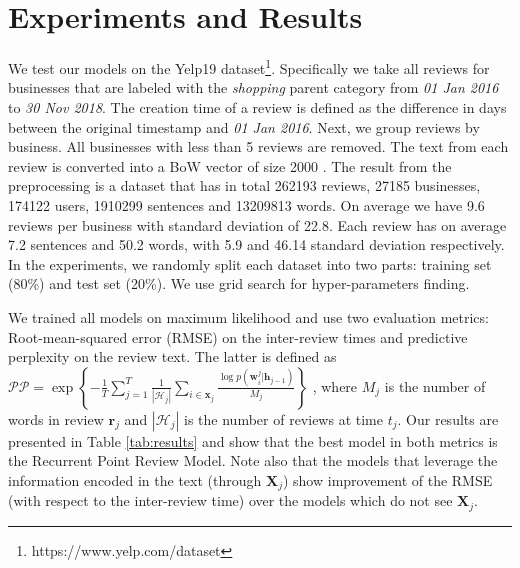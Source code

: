 \documentclass[letterpaper]{article} %
\newcommand{\+}[1]{\boldsymbol{\mathbf{#1}}}
\def\*#1{\mathbf{#1}}
\begin{document}
\section{Experiments and Results}
We test our models on the Yelp19 dataset\footnote{https://www.yelp.com/dataset}. Specifically we take all reviews for businesses that are labeled with the \textit{shopping} parent category from \textit{01 Jan 2016} to \textit{30 Nov 2018}. The creation time of a review is defined as the difference in days between the original timestamp and \textit{01 Jan 2016}. Next, we group reviews by business. All businesses with less than 5 reviews are removed. The text from each review is converted into a BoW vector of size 2000 \cite{NIPS2009_3856}. The result from the preprocessing is a dataset that has in total 262193 reviews, 27185 businesses, 174122 users, 1910299 sentences and 13209813 words. On average we have 9.6 reviews per business with standard deviation of 22.8. Each review has on average 7.2 sentences and 50.2 words, with 5.9 and 46.14 standard deviation respectively. In the experiments, we randomly split each dataset into two parts: training set (80\%) and test set (20\%). We use grid search for hyper-parameters finding. 

We trained all models on maximum likelihood and use two evaluation metrics: Root-mean-squared error (RMSE) on the inter-review times and predictive perplexity on the review text. The latter is defined as $\mathcal{PP}= \exp\left\{-\frac{1}{T}\sum^T_{j=1}\frac{1}{|\mathcal{H}_j|}\sum_{i\in \mathbf{x}_j}\frac{\log p(\mathbf{w}^j_i|\*h_{j-1})}{M_j}\right\}$ \cite{wang2012continuous}, where $M_j$ is the number of words in review $\*r_j$ and $|\mathcal{H}_j|$ is the number of reviews at time $t_j$. Our results are presented in Table \ref{tab:results} and show that the best model in both metrics is the Recurrent Point Review Model. Note also that the models that leverage the information encoded in the text (through $\*X_j$) show improvement of the RMSE (with respect to the inter-review time) over the models which do not see $\*X_j$. 
\end{document}
